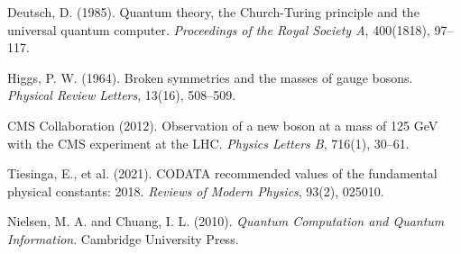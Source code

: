 \documentclass[12pt,a4paper]{article}
\begin{document}
	\begin{thebibliography}{99}
		Deutsch, D. (1985). Quantum theory, the Church-Turing principle and the universal quantum computer. \textit{Proceedings of the Royal Society A}, 400(1818), 97--117.
		
		Higgs, P. W. (1964). Broken symmetries and the masses of gauge bosons. \textit{Physical Review Letters}, 13(16), 508--509.
		
		CMS Collaboration (2012). Observation of a new boson at a mass of 125 GeV with the CMS experiment at the LHC. \textit{Physics Letters B}, 716(1), 30--61.
		
		Tiesinga, E., et al. (2021). CODATA recommended values of the fundamental physical constants: 2018. \textit{Reviews of Modern Physics}, 93(2), 025010.
		
		Nielsen, M. A. and Chuang, I. L. (2010). \textit{Quantum Computation and Quantum Information}. Cambridge University Press.
	\end{thebibliography}
	
\end{document}
